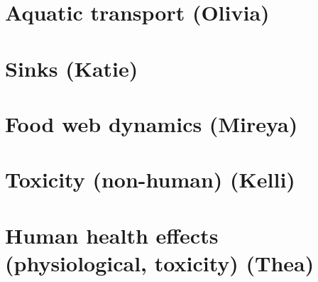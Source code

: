 \documentclass{article}\usepackage[]{graphicx}\usepackage[]{color}
\begin{document}
\section{Aquatic transport (Olivia)}

\section{Sinks (Katie)}\section{Food web dynamics (Mireya)}

\section{Toxicity (non-human) (Kelli)}

\section{Human health effects (physiological, toxicity) (Thea)}
\end{document}
